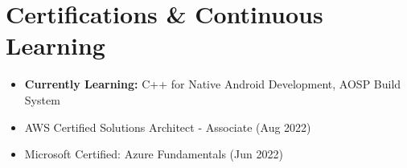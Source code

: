 \documentclass[11pt,a4paper]{article}
\begin{document}
\vspace{6pt}
\section*{Certifications \& Continuous Learning}
\begin{itemize}
\item \textbf{Currently Learning:} C++ for Native Android Development, AOSP Build System
\item AWS Certified Solutions Architect - Associate (Aug 2022)
\item Microsoft Certified: Azure Fundamentals (Jun 2022)
\end{itemize}
\end{document}
